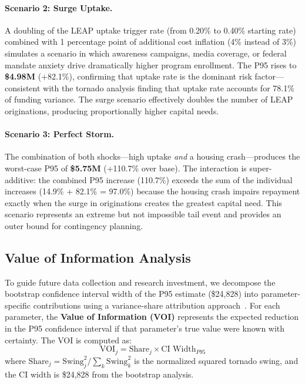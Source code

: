 \documentclass[11pt, letterpaper]{article}
\begin{document}
\paragraph{Scenario 2: Surge Uptake.} A doubling of the LEAP uptake trigger rate (from 0.20\% to 0.40\% starting rate) combined with 1 percentage point of additional cost inflation (4\% instead of 3\%) simulates a scenario in which awareness campaigns, media coverage, or federal mandate anxiety drive dramatically higher program enrollment. The P95 rises to \textbf{\$4.98M} (+82.1\%), confirming that uptake rate is the dominant risk factor---consistent with the tornado analysis finding that uptake rate accounts for 78.1\% of funding variance. The surge scenario effectively doubles the number of LEAP originations, producing proportionally higher capital needs.

\paragraph{Scenario 3: Perfect Storm.} The combination of both shocks---high uptake \textit{and} a housing crash---produces the worst-case P95 of \textbf{\$5.75M} (+110.7\% over base). The interaction is super-additive: the combined P95 increase (110.7\%) exceeds the sum of the individual increases (14.9\% + 82.1\% = 97.0\%) because the housing crash impairs repayment exactly when the surge in originations creates the greatest capital need. This scenario represents an extreme but not impossible tail event and provides an outer bound for contingency planning.

\subsection{Value of Information Analysis}

To guide future data collection and research investment, we decompose the bootstrap confidence interval width of the P95 estimate (\$24{,}828) into parameter-specific contributions using a variance-share attribution approach~\cite{howard1966}. For each parameter, the \textbf{Value of Information (VOI)} represents the expected reduction in the P95 confidence interval if that parameter's true value were known with certainty. The VOI is computed as:
\begin{equation}
  \text{VOI}_j = \text{Share}_j \times \text{CI Width}_{P95}
\end{equation}
where $\text{Share}_j = \text{Swing}_j^2 / \sum_k \text{Swing}_k^2$ is the normalized squared tornado swing, and the CI width is \$24{,}828 from the bootstrap analysis.
\end{document}
